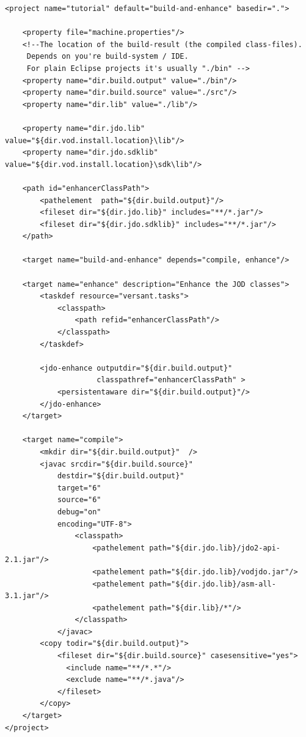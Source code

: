 \begin{lstlisting}
<project name="tutorial" default="build-and-enhance" basedir=".">

    <property file="machine.properties"/>
    <!--The location of the build-result (the compiled class-files).
     Depends on you're build-system / IDE.
     For plain Eclipse projects it's usually "./bin" -->
    <property name="dir.build.output" value="./bin"/>
    <property name="dir.build.source" value="./src"/>
    <property name="dir.lib" value="./lib"/>

    <property name="dir.jdo.lib" value="${dir.vod.install.location}\lib"/>
    <property name="dir.jdo.sdklib" value="${dir.vod.install.location}\sdk\lib"/>

    <path id="enhancerClassPath">
        <pathelement  path="${dir.build.output}"/>
        <fileset dir="${dir.jdo.lib}" includes="**/*.jar"/>
        <fileset dir="${dir.jdo.sdklib}" includes="**/*.jar"/>
    </path>

    <target name="build-and-enhance" depends="compile, enhance"/>

    <target name="enhance" description="Enhance the JOD classes">
        <taskdef resource="versant.tasks">
            <classpath>
                <path refid="enhancerClassPath"/>
            </classpath>
        </taskdef>

        <jdo-enhance outputdir="${dir.build.output}"
                     classpathref="enhancerClassPath" >
            <persistentaware dir="${dir.build.output}"/>
        </jdo-enhance>
    </target>

    <target name="compile">
        <mkdir dir="${dir.build.output}"  />
        <javac srcdir="${dir.build.source}"
            destdir="${dir.build.output}"
            target="6"
            source="6"
            debug="on"
            encoding="UTF-8">
                <classpath>
                    <pathelement path="${dir.jdo.lib}/jdo2-api-2.1.jar"/>
                    <pathelement path="${dir.jdo.lib}/vodjdo.jar"/>
                    <pathelement path="${dir.jdo.lib}/asm-all-3.1.jar"/>
                    <pathelement path="${dir.lib}/*"/>
                </classpath>
            </javac>
        <copy todir="${dir.build.output}">
            <fileset dir="${dir.build.source}" casesensitive="yes">
              <include name="**/*.*"/>
              <exclude name="**/*.java"/>
            </fileset>
        </copy>
    </target>
</project>
\end{lstlisting}

